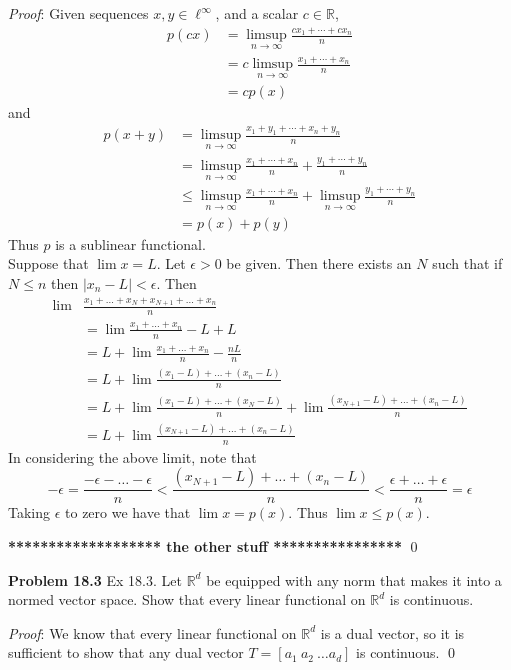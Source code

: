 \documentclass[12pt]{article}
\newcommand{\problem}[1]{\hspace{-4 ex} \large \textbf{Problem #1} }
\renewenvironment{proof}{\hspace{-4 ex} \emph{Proof}:}{\qed}
\newcommand{\RR}{\mathbb{R}}
\begin{document}
	\begin{proof}
		Given sequences $x,y \in \ell^\infty$, and a scalar $c \in \RR$, 
		\begin{align*}
			p(cx) & = \limsup_{n\to\infty}\frac{cx_1+\cdots+cx_n}{n} \\
			& = c \limsup_{n\to\infty}\frac{x_1+\cdots+x_n}{n} \\
			& = cp(x)
		\end{align*}
		and
		\begin{align*}
			p(x+y) & = \limsup_{n\to\infty}\frac{x_1+y_1+\cdots+x_n+y_n}{n} \\
			& = \limsup_{n\to\infty}\frac{x_1+\cdots+x_n}{n} + \frac{y_1+\cdots+y_n}{n}\\
			& \leq \limsup_{n\to\infty}\frac{x_1+\cdots+x_n}{n} + \limsup_{n\to\infty} \frac{y_1+\cdots+y_n}{n}\\
			& = p(x) + p(y)
		\end{align*}
		Thus $p$ is a sublinear functional. \\
		Suppose that $\lim x = L$. Let $\epsilon > 0$ be given. Then there exists an $N$ such that if $N \leq n$ then $\vert x_n - L \vert < \epsilon$. Then
		\begin{align*}
			\lim & \frac{x_1 + \dots +x_N + x_{N+1} + \dots + x_n}{n}\\
			& = \lim \frac{x_1 + \dots + x_n}{n} -L +L \\
			& = L + \lim \frac{x_1 + \dots + x_n}{n} -\frac{nL}{n} \\
			& = L + \lim \frac{(x_1-L) + \dots  + (x_n-L)}{n} \\
			& = L + \lim \frac{(x_1-L) + \dots + (x_N-L)}{n} + \lim \frac{(x_{N+1}-L) + \dots + (x_n-L)}{n} \\
			& = L + \lim \frac{(x_{N+1}-L) + \dots + (x_n-L)}{n}
		\end{align*}
		In considering the above limit, note that
		$$
		-\epsilon = \frac{ -\epsilon - \dots	- \epsilon}{n} < \frac{(x_{N+1}-L) + \dots + (x_n-L)}{n} < \frac{ \epsilon + \dots	+ \epsilon}{n} = \epsilon
		$$
		Taking $\epsilon$ to zero we have that $\lim x = p(x)$. Thus $\lim x \leq p(x)$. 
		
		\textbf{******************* the other stuff  ****************}
	\end{proof}

\problem{18.3}
Ex 18.3. Let $\RR^d$ be equipped with any norm that makes it into a normed vector space. Show that every linear functional on $\RR^d$ is continuous.

	\begin{proof}
		We know that every linear functional on $\RR^d$ is a dual vector, so it is sufficient to show that any dual vector $T=[a_1\ a_2\ \dots a_d]$ is continuous. 
	\end{proof}
\end{document}
